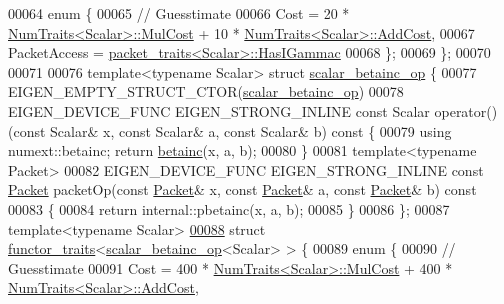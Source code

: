 \begin{DoxyCode}
00064   \textcolor{keyword}{enum} \{
00065     \textcolor{comment}{// Guesstimate}
00066     Cost = 20 * \hyperlink{group___core___module_struct_eigen_1_1_num_traits}{NumTraits<Scalar>::MulCost} + 10 * 
      \hyperlink{group___core___module_struct_eigen_1_1_num_traits}{NumTraits<Scalar>::AddCost},
00067     PacketAccess = \hyperlink{struct_eigen_1_1internal_1_1packet__traits}{packet\_traits<Scalar>::HasIGammac}
00068   \};
00069 \};
00070 
00071 
00076 \textcolor{keyword}{template}<\textcolor{keyword}{typename} Scalar> \textcolor{keyword}{struct }\hyperlink{struct_eigen_1_1internal_1_1scalar__betainc__op}{scalar\_betainc\_op} \{
00077   EIGEN\_EMPTY\_STRUCT\_CTOR(\hyperlink{struct_eigen_1_1internal_1_1scalar__betainc__op}{scalar\_betainc\_op})
00078   EIGEN\_DEVICE\_FUNC EIGEN\_STRONG\_INLINE \textcolor{keyword}{const} Scalar operator() (\textcolor{keyword}{const} Scalar& x, \textcolor{keyword}{const} Scalar& a, \textcolor{keyword}{const} 
      Scalar& b)\textcolor{keyword}{ const }\{
00079     \textcolor{keyword}{using} numext::betainc; \textcolor{keywordflow}{return} \hyperlink{namespace_eigen_a726eae91d4e91d8e25cbe55fffa6a92f}{betainc}(x, a, b);
00080   \}
00081   \textcolor{keyword}{template}<\textcolor{keyword}{typename} Packet>
00082   EIGEN\_DEVICE\_FUNC EIGEN\_STRONG\_INLINE \textcolor{keyword}{const} \hyperlink{union_eigen_1_1internal_1_1_packet}{Packet} packetOp(\textcolor{keyword}{const} \hyperlink{union_eigen_1_1internal_1_1_packet}{Packet}& x, \textcolor{keyword}{const} 
      \hyperlink{union_eigen_1_1internal_1_1_packet}{Packet}& a, \textcolor{keyword}{const} \hyperlink{union_eigen_1_1internal_1_1_packet}{Packet}& b)\textcolor{keyword}{ const}
00083 \textcolor{keyword}{  }\{
00084     \textcolor{keywordflow}{return} internal::pbetainc(x, a, b);
00085   \}
00086 \};
00087 \textcolor{keyword}{template}<\textcolor{keyword}{typename} Scalar>
\hyperlink{struct_eigen_1_1internal_1_1functor__traits_3_01scalar__betainc__op_3_01_scalar_01_4_01_4}{00088} \textcolor{keyword}{struct }\hyperlink{struct_eigen_1_1internal_1_1functor__traits}{functor\_traits}<\hyperlink{struct_eigen_1_1internal_1_1scalar__betainc__op}{scalar\_betainc\_op}<Scalar> > \{
00089   \textcolor{keyword}{enum} \{
00090     \textcolor{comment}{// Guesstimate}
00091     Cost = 400 * \hyperlink{group___core___module_struct_eigen_1_1_num_traits}{NumTraits<Scalar>::MulCost} + 400 * 
      \hyperlink{group___core___module_struct_eigen_1_1_num_traits}{NumTraits<Scalar>::AddCost},

\end{DoxyCode}
